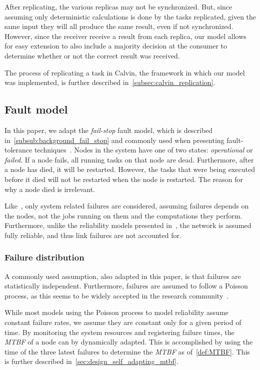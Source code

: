 \documentclass{cslthse-msc}
\begin{document}
After replicating, the various replicas may not be synchronized. But, since assuming only deterministic calculations is done by the tasks replicated, given the same input they will all produce the same result, even if not synchronized. However, since the receiver receive a result from each replica, our model allows for easy extension to also include a majority decision at the consumer to determine whether or not the correct result was received. %

The process of replicating a task in Calvin, the framework in which our model was implemented, is further described in~\cref{subsec:calvin_replication}.

\subsection{Fault model} \label{subsec:design_fault_model}
In this paper, we adapt the \emph{fail-stop} fault model, which is described in~\cref{subsub:background_fail_stop} and commonly used when presenting fault-tolerance techniques~\cite{surveyFaultParallel}. Nodes in the system have one of two states: \emph{operational} or \emph{failed}. If a node fails, all running tasks on that node are dead. Furthermore, after a node has died, it will be restarted. However, the tasks that were being executed before it died will not be restarted when the node is restarted. The reason for why a node died is irrelevant.

Like~\cite{selfAdaptRel}, only system related failures are considered, assuming failures depends on the nodes, not the jobs running on them and the computations they perform. Furthermore, unlike the reliability models presented in~\cite{taskSchedulingReplication, taskAllocationSwarm, relAnalysisFRA}, the network is assumed fully reliable, and thus link failures are not accounted for.

\subsubsection{Failure distribution} \label{design:failure_distribution}
A commonly used assumption, also adapted in this paper, is that failures are statistically independent. Furthermore, failures are assumed to follow a Poisson process, as this seems to be widely accepted in the research community~\cite{experimentalFailureAssessment}. 

While most models using the Poisson process to model reliability assume constant failure rates, we assume they are constant only for a given period of time. By monitoring the system resources and registering failure times, the \emph{MTBF} of a node can by dynamically adapted. This is accomplished by using the time of the three latest failures to determine the \emph{MTBF} as of~\cref{def:MTBF}. This is further described in~\cref{sec:design_self_adapting_mtbf}. 
\end{document}
